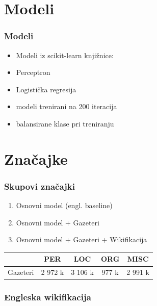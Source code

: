 \documentclass{beamer}
\begin{document}
\section{Modeli}
\begin{frame}
\frametitle{Modeli}
\begin{itemize}
\item Modeli iz scikit-learn knjižnice:
\item Perceptron
\item Logistička regresija
\item modeli trenirani na 200 iteracija
\item balansirane klase pri treniranju
\end{itemize}
\end{frame}

\section{Značajke}
\begin{frame}
\frametitle{Skupovi značajki}
\begin{enumerate}
\item Osnovni model (engl. baseline) 
\item Osnovni model + Gazeteri
\item Osnovni model + Gazeteri + Wikifikacija
\end{enumerate}
\begin{center}
\begin{tabular}{ lcccc }
\hline
 & PER & LOC & ORG & MISC\\ 
\hline
Gazeteri & 2 972 k & 3 106 k & 977 k & 2 991 k \\
\hline
\end{tabular}
\end{center}
\end{frame}

\begin{frame}
\frametitle{Engleska wikifikacija}
\begin{center}
\end{center}
\end{frame}
\end{document}
